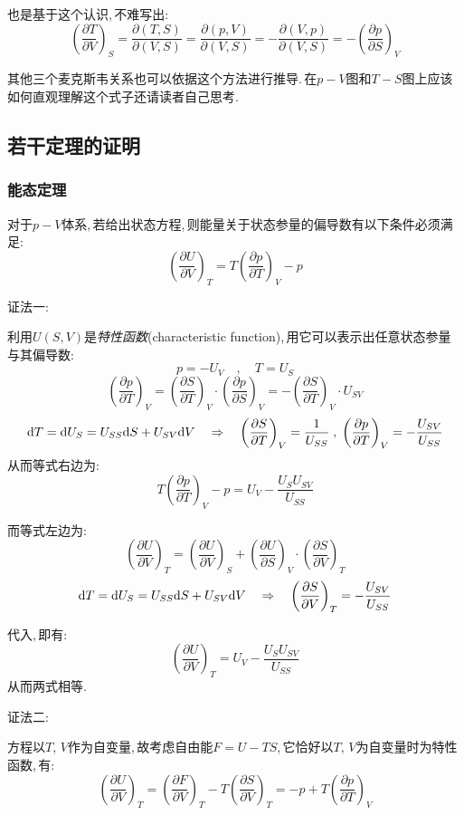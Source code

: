 也是基于这个认识,\,不难写出:
\[\left(\frac{\partial T}{\partial V}\right)_S=\frac{\partial(T,S)}{\partial(V,S)}=\frac{\partial(p,V)}{\partial(V,S)}=-\frac{\partial(V,p)}{\partial(V,S)}=-\left(\frac{\partial p}{\partial S}\right)_V\]

其他三个麦克斯韦关系也可以依据这个方法进行推导.\,在$p-V$图和$T-S$图上应该如何直观理解这个式子还请读者自己思考.

\subsection{若干定理的证明}
\vspace{0.5cm}
\subsubsection{\hei 能态定理}
对于$p-V$体系,\,若给出状态方程,\,则能量关于状态参量的偏导数有以下条件必须满足:
\[\left(\frac{\partial U}{\partial V}\right)_T=T\left(\frac{\partial p}{\partial T}\right)_V-p\]

\npg{-3cm}
{\hei 证法一:}

利用$U(S,V)$是\emph{特性函数}(characteristic function),\,用它可以表示出任意状态参量与其偏导数:
\[p=-U_V\quad,\quad T=U_S \]
\[\left(\frac{\partial p}{\partial T}\right)_V=\left(\frac{\partial S}{\partial T}\right)_V\cdot\left(\frac{\partial p}{\partial S}\right)_V=-\left(\frac{\partial S}{\partial T}\right)_V\cdot U_{SV}\]
\[\textrm{d} T=\textrm{d} U_S=U_{SS}\textrm{d} S+U_{SV}\textrm{d} V\quad \Rightarrow \quad \left(\frac{\partial S}{\partial T}\right)_V=\frac{1}{U_{SS}}\; ,\;\left(\frac{\partial p}{\partial T}\right)_V=-\frac{U_{SV}}{U_{SS}}\]
从而等式右边为:
\[T\left(\frac{\partial p}{\partial T}\right)_V-p=U_V-\frac{U_S U_{SV}}{U_{SS}}\]

而等式左边为:
\[\left(\frac{\partial U}{\partial V}\right)_T=\left(\frac{\partial U}{\partial V}\right)_S+\left(\frac{\partial U}{\partial S}\right)_V\cdot\left(\frac{\partial S}{\partial V}\right)_T\]
\[\textrm{d} T=\textrm{d} U_S=U_{SS}\textrm{d} S+U_{SV}\textrm{d} V\quad \Rightarrow \quad \left(\frac{\partial S}{\partial V}\right)_T=-\frac{U_{SV}}{U_{SS}}\]

代入,\,即有:
\[\left(\frac{\partial U}{\partial V}\right)_T=U_V-\frac{U_S U_{SV}}{U_{SS}}\]
从而两式相等.

\vspace{1cm}
{\hei 证法二:}

方程以$T,\,V$作为自变量,\,故考虑自由能$F=U-TS$,\,它恰好以$T,\,V$为自变量时为特性函数,\,有:
\[\left(\frac{\partial U}{\partial V}\right)_T=\left(\frac{\partial F}{\partial V}\right)_T-T\left(\frac{\partial S}{\partial V}\right)_T=-p+T\left(\frac{\partial p}{\partial T}\right)_V\]

